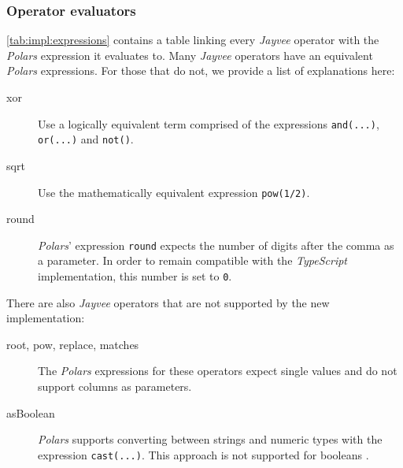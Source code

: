 \subsubsection{Operator evaluators}
\label{subsubsection:impl:operator_evaluator}
\autoref{tab:impl:expressions} contains a table linking every \emph{Jayvee} operator with the \emph{Polars} expression it evaluates to.
Many \emph{Jayvee} operators have an equivalent \emph{Polars} expressions.
For those that do not, we provide a list of explanations here:
\begin{description}
	\item[xor] Use a logically equivalent term comprised of the expressions \Verb|and(...)|, \Verb|or(...)| and \Verb|not()|.
	\item[sqrt] Use the mathematically equivalent expression \Verb|pow(1/2)|.
	\item[round] \emph{Polars}' expression \Verb|round| expects the number of digits after the comma as a parameter.
	      In order to remain compatible with the \emph{TypeScript} implementation, this number is set to \Verb|0|.
\end{description}
\begin{minipage}{\linewidth}
	There are also \emph{Jayvee} operators that are not supported by the new implementation:
	\begin{description}
		\item[root, pow, replace, matches] The \emph{Polars} expressions for these operators expect single values and do not support columns as parameters.
		\item[asBoolean] \emph{Polars} supports converting between strings and numeric types with the expression \Verb|cast(...)|.
		      This approach is not supported for booleans \autocite{polars:docs:expr:parsing}.
	\end{description}
\end{minipage}

